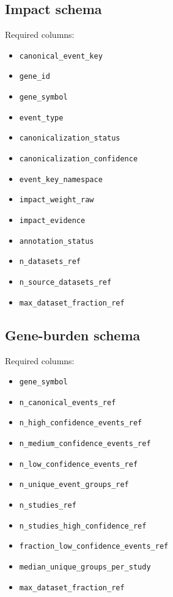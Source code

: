 \documentclass[11pt]{article}
\begin{document}
\subsection{Impact schema}
Required columns:
\begin{itemize}[leftmargin=2em]
\item \texttt{canonical\_event\_key}
\item \texttt{gene\_id}
\item \texttt{gene\_symbol}
\item \texttt{event\_type}
\item \texttt{canonicalization\_status}
\item \texttt{canonicalization\_confidence}
\item \texttt{event\_key\_namespace}
\item \texttt{impact\_weight\_raw}
\item \texttt{impact\_evidence}
\item \texttt{annotation\_status}
\item \texttt{n\_datasets\_ref}
\item \texttt{n\_source\_datasets\_ref}
\item \texttt{max\_dataset\_fraction\_ref}
\end{itemize}

\subsection{Gene-burden schema}
Required columns:
\begin{itemize}[leftmargin=2em]
\item \texttt{gene\_symbol}
\item \texttt{n\_canonical\_events\_ref}
\item \texttt{n\_high\_confidence\_events\_ref}
\item \texttt{n\_medium\_confidence\_events\_ref}
\item \texttt{n\_low\_confidence\_events\_ref}
\item \texttt{n\_unique\_event\_groups\_ref}
\item \texttt{n\_studies\_ref}
\item \texttt{n\_studies\_high\_confidence\_ref}
\item \texttt{fraction\_low\_confidence\_events\_ref}
\item \texttt{median\_unique\_groups\_per\_study}
\item \texttt{max\_dataset\_fraction\_ref}
\end{itemize}
\end{document}
